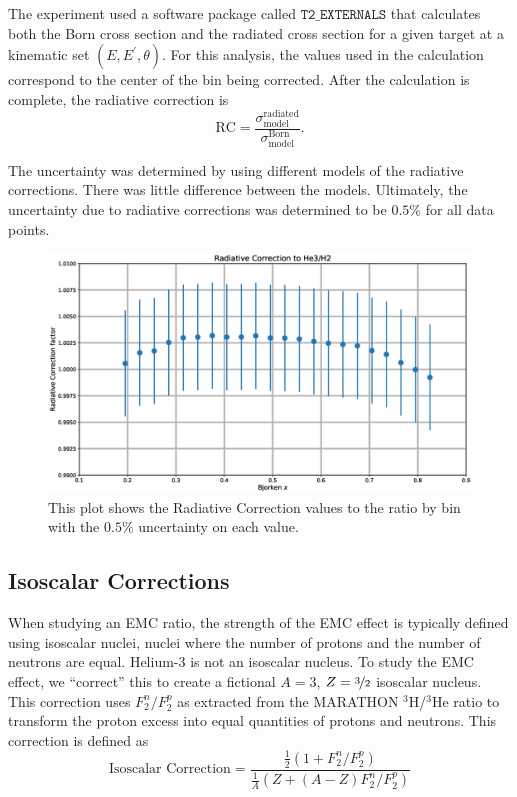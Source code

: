 The experiment used a software package called $\texttt{T2\_EXTERNALS}$ that calculates both the Born cross section and the radiated cross section for a given target at a kinematic set $(E,E^{\prime} ,\theta )$. For this analysis, the values used in the calculation correspond to the center of the bin being corrected. After the calculation is complete, the radiative correction is
\begin{equation}
	\textrm{RC} = \frac{\sigma^{\textrm{radiated}}_{\textrm{model}}}{\sigma^{\textrm{Born}}_{\textrm{model}}}.
\end{equation}

The uncertainty was determined by using different models of the radiative corrections. There was little difference between the models. Ultimately, the uncertainty due to radiative corrections was determined to be $0.5\%$ for all data points.

\begin{figure}
	\includegraphics[width=\textwidth]{./analysis/fig/radcor.eps}
	\caption{This plot shows the Radiative Correction values to the  ratio by bin with the $0.5\%$ uncertainty on each value.}
\end{figure}

\subsection{Isoscalar Corrections}

When studying an EMC ratio, the strength of the EMC effect is typically defined using isoscalar nuclei, nuclei where the number of protons and the number of neutrons are equal. Helium-3 is not an isoscalar nucleus. To study the EMC effect, we ``correct'' this to create a fictional $A=3$, $Z=\nicefrac{3}{2}$ isoscalar nucleus. This correction uses $F_2^n/F_2^p$ as extracted from the MARATHON $^3$H/$^3$He ratio to transform the proton excess into equal quantities of protons and neutrons. This correction is defined as
\begin{equation}
	\textrm{Isoscalar Correction} = \frac{\frac{1}{2}\left(1+F_2^n/F_2^p\right)}{\frac{1}{A}\left(Z+\left(A-Z\right)F_2^n/F_2^p\right)}
\end{equation}

